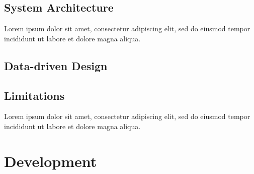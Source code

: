 \documentclass[12pt, a4paper]{article}
\begin{document}

\subsection{System Architecture}



Lorem ipsum dolor sit amet, consectetur adipiscing elit, sed do eiusmod tempor incididunt ut labore et dolore magna aliqua.


\subsection{Data-driven Design}


\subsection{Limitations}


Lorem ipsum dolor sit amet, consectetur adipiscing elit, sed do eiusmod tempor incididunt ut labore et dolore magna aliqua.

\pagebreak


\section{Development}

\end{document}
